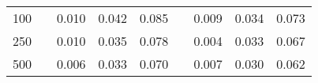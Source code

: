 % 
\begin{tabular}{ccccccccc}
  \hline
  \hline
100 &  & 0.010 & 0.042 & 0.085 &  & 0.009 & 0.034 & 0.073 \\ 
  250 &  & 0.010 & 0.035 & 0.078 &  & 0.004 & 0.033 & 0.067 \\ 
  500 &  & 0.006 & 0.033 & 0.070 &  & 0.007 & 0.030 & 0.062 \\ 
   \hline
\end{tabular}
